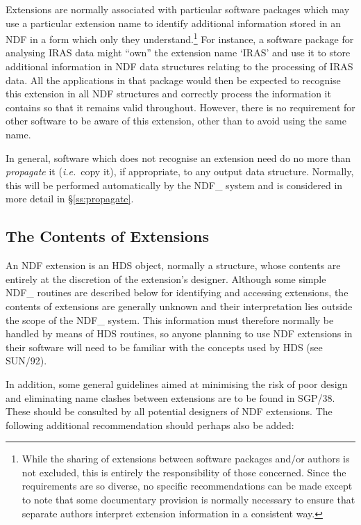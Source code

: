\documentclass[twoside,11pt]{article}
\newcommand{\xref}[3]{#1}
\newcommand{\xlabel}[1]{}
\newcommand{\st}[1]{{\em{#1}}}
\begin{document}
Extensions are normally associated with particular software packages which
may use a particular extension name to identify additional information
stored in an NDF in a form which only they understand.\footnote{While the
sharing of extensions between software packages and/or authors is not
excluded, this is entirely the responsibility of those concerned. Since the
requirements are so diverse, no specific recommendations can be made except
to note that some documentary provision is normally necessary to ensure that
separate authors interpret extension information in a consistent way.} 
For instance, a software package for analysing IRAS data might ``own'' the
extension name `IRAS' and use it to store additional information in NDF data
structures relating to the processing of IRAS data. 
All the applications in that package would then be expected to recognise
this extension in all NDF structures and correctly process the information
it contains so that it remains valid throughout. 
However, there is no requirement for other software to be aware of this
extension, other than to avoid using the same name.

In general, software which does not recognise an extension need do no more
than \st{propagate\/} it (\st{i.e.}\ copy it), if appropriate, to any output
data structure. 
Normally, this will be performed automatically by the NDF\_ system and is
considered in more detail in \S\ref{ss:propagate}. 

\subsection{\xlabel{the_contents_of_extensions}The Contents of Extensions}

An NDF extension is an \xref{HDS object}{sun92}{HDS_objects}, normally
a structure, whose contents are entirely at the discretion of the
extension's designer.
Although some simple NDF\_ routines are described below for identifying and
accessing extensions, the contents of extensions are generally unknown and
their interpretation lies outside the scope of the NDF\_ system.
This information must therefore normally be handled by means of HDS
routines, so anyone planning to use NDF extensions in their software will
need to be familiar with the concepts used by HDS (see
\xref{SUN/92}{sun92}{}).

In addition, some general guidelines aimed at minimising the risk of poor
design and eliminating name clashes between extensions are to be found in
\xref{SGP/38}{sgp38}{}. 
These should be consulted by all potential designers of NDF extensions. 
The following additional recommendation should perhaps also be added:
\end{document}
